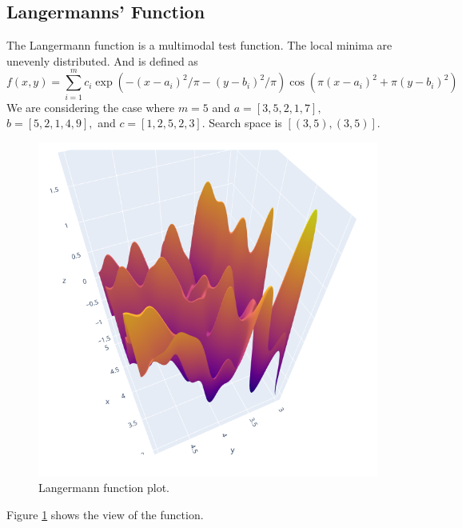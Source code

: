 \subsection{Langermanns' Function}
The Langermann function is a multimodal test function. The local minima are unevenly distributed.
And is defined as $$ f(x,y) = \sum_{i=1}^{m}c_i \exp(-(x-a_i)^2 / \pi - (y - b_i)^2 / \pi) \cos(\pi (x-a_i)^2 + \pi (y - b_i)^2) $$
We are considering the case where $m=5$ and $a=[3, 5, 2, 1, 7],$ $b = [5, 2, 1, 4, 9],$ and $c = [1, 2, 5, 2, 3]$. Search space is $[(3, 5), (3, 5)]$.
\begin{figure}
	\centering
	\includegraphics[scale=0.4]{figures/langermann-function-plot.png}
	\caption{Langermann function plot.}
	\label{fig:langermann-function-plot}
\end{figure}
Figure \ref{fig:langermann-function-plot} shows the view of the function.


